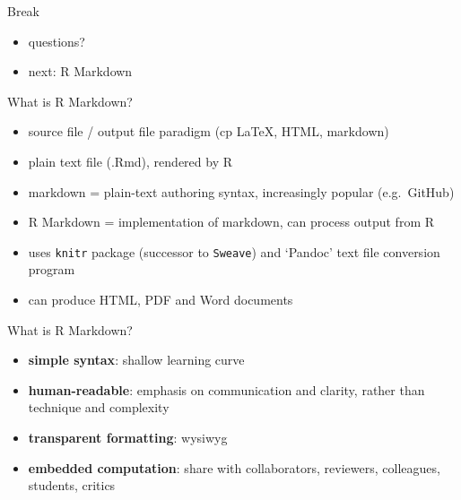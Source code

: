 \documentclass[ignorenonframetext,]{beamer}
\begin{document}
\begin{frame}{Break}

\begin{itemize}[<+->]
\itemsep1pt\parskip0pt
\item
  questions?
\item
  next: R Markdown
\end{itemize}

\end{frame}

\begin{frame}{What is R Markdown?}

\begin{itemize}[<+->]
\itemsep1pt\parskip0pt
\item
  source file / output file paradigm (cp LaTeX, HTML, markdown)
\item
  plain text file (.Rmd), rendered by R
\item
  markdown = plain-text authoring syntax, increasingly popular
  (e.g.~GitHub)
\item
  R Markdown = implementation of markdown, can process output from R
\item
  uses \texttt{knitr} package (successor to \texttt{Sweave}) and
  `Pandoc' text file conversion program
\item
  can produce HTML, PDF and Word documents
\end{itemize}

\end{frame}

\begin{frame}{What is R Markdown?}

\begin{itemize}[<+->]
\itemsep1pt\parskip0pt
\item
  \textbf{simple syntax}: shallow learning curve
\item
  \textbf{human-readable}: emphasis on communication and clarity, rather
  than technique and complexity
\item
  \textbf{transparent formatting}: wysiwyg
\item
  \textbf{embedded computation}: share with collaborators, reviewers,
  colleagues, students, critics
\end{itemize}

\end{frame}
\end{document}

